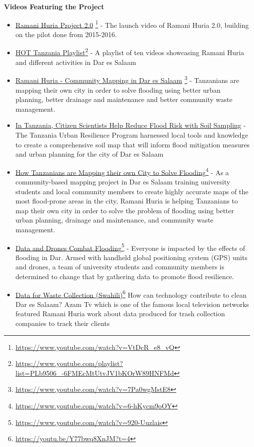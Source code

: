 \documentclass[a4paper,12pt,twoside]{article}
\begin{document}
\textbf{Videos Featuring the Project}
	\begin{itemize}
		\item \href{https://www.youtube.com/watch?v=VtDcR_e8_vQ}{Ramani Huria Project 2.0} \footnote{\url{https://www.youtube.com/watch?v=VtDcR_e8_vQ}}
		- The launch video of Ramani Huria 2.0, building on the pilot done from 2015-2016.
		\item \href{https://www.youtube.com/playlist?list=PLb9506_-6FMEcMtUtvJV1bKOrW89HNFMd}{HOT Tanzania Playlist}\footnote{\url{https://www.youtube.com/playlist?list=PLb9506_-6FMEcMtUtvJV1bKOrW89HNFMd}}
		- A playlist of ten videos showcasing Ramani Huria and different activities in Dar es Salaam
		\item \href{https://www.youtube.com/watch?v=7Pa0wgMstE8}{Ramani Huria - Community Mapping in Dar es Salaam} \footnote{\url{https://www.youtube.com/watch?v=7Pa0wgMstE8}} - Tanzanians are mapping their own city in order to solve flooding using better urban planning, better drainage and maintenance and better community waste management.
		\item \href{https://www.worldbank.org/en/news/video/2019/05/15/in-tanzania-citizen-scientists-help-reduce-flood-risk-with-soil-sampling}{In Tanzania, Citizen Scientists Help Reduce Flood Risk with Soil Sampling}
		- The Tanzania Urban Resilience Program harnessed local tools and knowledge to create a comprehensive soil map that will inform flood mitigation measures and urban planning for the city of Dar es Salaam
		\item \href{https://www.youtube.com/watch?v=6-hKycm9oOY}{How Tanzanians are Mapping their own City to Solve Flooding}\footnote{\url{https://www.youtube.com/watch?v=6-hKycm9oOY}}
		- As a community-based mapping project in Dar es Salaam training university students and local community members to create highly accurate maps of the most flood-prone areas in the city, Ramani Huria is helping Tanzanians to map their own city in order to solve the problem of flooding using better urban planning, drainage and maintenance, and community waste management.
		\item \href{https://www.youtube.com/watch?v=920-Uuzlais}{Data and Drones Combat Flooding}\footnote{\url{https://www.youtube.com/watch?v=920-Uuzlais}}
		- Everyone is impacted by the effects of flooding in Dar. Armed with handheld global positioning system (GPS) units and drones, a team of university students and community members is determined to change that by gathering data to promote flood resilience.
		\item \href{https://youtu.be/Y77bwq8XnJM?t=4}{ Data for Waste Collection (Swahili)}\footnote{\url{https://youtu.be/Y77bwq8XnJM?t=4}}
		How can technology contribute to clean Dar es Salaam? Azam Tv which is one of the famous local television networks featured Ramani Huria work about data produced for trash collection companies to track their clients
	\end{itemize}
\end{document}
